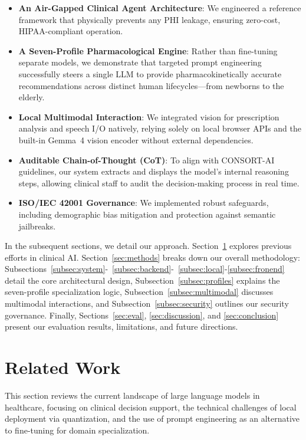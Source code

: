\documentclass[9pt,conference]{IEEEtran}
\begin{document}
\begin{itemize}
  \item \textbf{An Air-Gapped Clinical Agent Architecture}: We engineered a reference framework that physically prevents any PHI leakage, ensuring zero-cost, HIPAA-compliant operation.
  \item \textbf{A Seven-Profile Pharmacological Engine}: Rather than fine-tuning separate models, we demonstrate that targeted prompt engineering successfully steers a single LLM to provide pharmacokinetically accurate recommendations across distinct human lifecycles---from newborns to the elderly.
  \item \textbf{Local Multimodal Interaction}: We integrated vision for prescription analysis and speech I/O natively, relying solely on local browser APIs and the built-in Gemma~4 vision encoder without external dependencies.
  \item \textbf{Auditable Chain-of-Thought (CoT)}: To align with CONSORT-AI guidelines, our system extracts and displays the model's internal reasoning steps, allowing clinical staff to audit the decision-making process in real time.
  \item \textbf{ISO/IEC 42001 Governance}: We implemented robust safeguards, including demographic bias mitigation and protection against semantic jailbreaks.
\end{itemize}



In the subsequent sections, we detail our approach. Section~\ref{sec:related} explores previous efforts in clinical AI. Section~\ref{sec:methods} breaks down our overall methodology: Subsections~\ref{subsec:system}-~\ref{subsec:backend}-~\ref{subsec:local}-\ref{subsec:fronend} detail the core architectural design, Subsection~\ref{subsec:profiles} explains the seven-profile specialization logic, Subsection~\ref{subsec:multimodal} discusses multimodal interactions, and Subsection~\ref{subsec:security} outlines our security governance. Finally, Sections~\ref{sec:eval}, \ref{sec:discussion}, and \ref{sec:conclusion} present our evaluation results, limitations, and future directions.


\section{Related Work}
\label{sec:related}

This section reviews the current landscape of large language models in healthcare, focusing on clinical decision support, the technical challenges of local deployment via quantization, and the use of prompt engineering as an alternative to fine-tuning for domain specialization.
\end{document}
